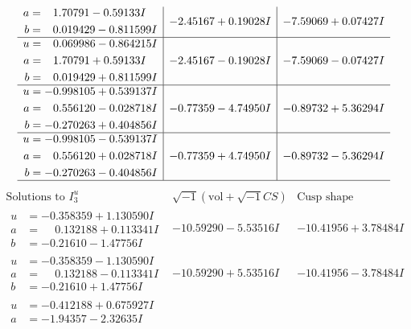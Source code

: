 \documentclass[1p]{elsarticle_modified}
\theoremstyle{definition}
\newcommand{\I}{\sqrt{-1}}
\begin{document}
$$\begin{array}{c|c|c}
\begin{aligned}
a &= \phantom{-}1.70791 - 0.59133 I \\
b &= \phantom{-}0.019429 - 0.811599 I\end{aligned}
 & -2.45167 + 0.19028 I & -7.59069 + 0.07427 I \\ \hline\begin{aligned}
u &= \phantom{-}0.069986 - 0.864215 I \\
a &= \phantom{-}1.70791 + 0.59133 I \\
b &= \phantom{-}0.019429 + 0.811599 I\end{aligned}
 & -2.45167 - 0.19028 I & -7.59069 - 0.07427 I \\ \hline\begin{aligned}
u &= -0.998105 + 0.539137 I \\
a &= \phantom{-}0.556120 - 0.028718 I \\
b &= -0.270263 + 0.404856 I\end{aligned}
 & -0.77359 - 4.74950 I & -0.89732 + 5.36294 I \\ \hline\begin{aligned}
u &= -0.998105 - 0.539137 I \\
a &= \phantom{-}0.556120 + 0.028718 I \\
b &= -0.270263 - 0.404856 I\end{aligned}
 & -0.77359 + 4.74950 I & -0.89732 - 5.36294 I\\
 \hline 
 \end{array}$$\newpage$$\begin{array}{c|c|c}  
\text{Solutions to }I^u_{3}& \I (\text{vol} + \sqrt{-1}CS) & \text{Cusp shape}\\
 \hline 
\begin{aligned}
u &= -0.358359 + 1.130590 I \\
a &= \phantom{-}0.132188 + 0.113341 I \\
b &= -0.21610 - 1.47756 I\end{aligned}
 & -10.59290 - 5.53516 I & -10.41956 + 3.78484 I \\ \hline\begin{aligned}
u &= -0.358359 - 1.130590 I \\
a &= \phantom{-}0.132188 - 0.113341 I \\
b &= -0.21610 + 1.47756 I\end{aligned}
 & -10.59290 + 5.53516 I & -10.41956 - 3.78484 I \\ \hline\begin{aligned}
u &= -0.412188 + 0.675927 I \\
a &= -1.94357 - 2.32635 I \\

\end{aligned}
\end{array}$$
\end{document}
